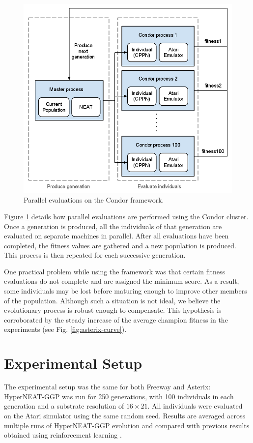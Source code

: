 \documentclass{acm_proc_article-sp}
\begin{document}
\begin{figure}[ht]
\begin{center}
\includegraphics[width=\columnwidth]{figures/condor-hyperneat-small.png}
\end{center}
\caption{Parallel evaluations on the Condor framework.}
\label{fig:condor}
\end{figure}

Figure \ref{fig:condor} details how parallel evaluations are performed using the Condor cluster. Once a generation is produced, all the individuals of that generation are evaluated on separate machines in parallel. After all evaluations have been completed, the fitness values are gathered and a new population is produced. This process is then repeated for each successive generation. 

One practical problem while using the framework was that certain fitness evaluations do not complete and are assigned the minimum score. As a result, some individuals may be lost before maturing enough to improve other members of the population. Although such a situation is not ideal, we believe the evolutionary process is robust enough to compensate. This hypothesis is corroborated by the steady increase of the average champion fitness in the experiments (see Fig. \ref{fig:asterix-curve}). 

\section{Experimental Setup}
\label{sec:experiments}
The experimental setup was the same for both Freeway and Asterix: HyperNEAT-GGP was run for 250 generations, with 100 individuals in each generation and a substrate resolution of $16\times 21$. All individuals were evaluated on the Atari simulator using the same random seed. Results are averaged across multiple runs of HyperNEAT-GGP evolution and compared with previous results obtained using reinforcement learning \cite{naddaf10}. 
\end{document}
